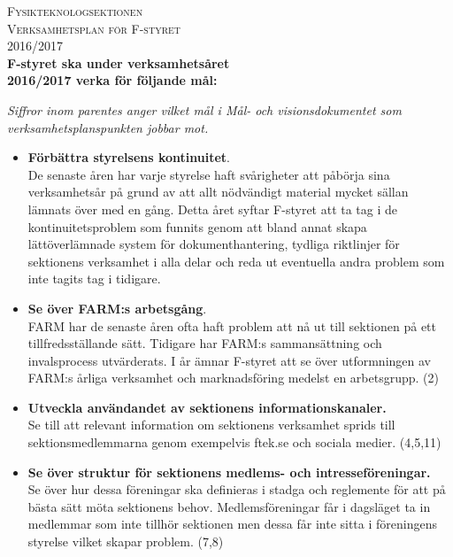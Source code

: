 \documentclass[a4paper]{article}
\begin{document}
\begin{center}
\textsc{\Huge Fysikteknologsektionen}\\[0.5cm]
\textsc{\large Verksamhetsplan för F-styret\\}
\textsc{\large 2016/2017}\\[0.5cm] %


\large \textbf{F-styret ska under verksamhetsåret\\2016/2017 verka för
följande mål:}\\
\normalsize
\end{center}
\textit{Siffror inom parentes anger vilket mål i Mål- och visionsdokumentet som verksamhetsplanspunkten jobbar mot.}\\
\normalsize

\begin{itemize}

\item \textbf{Förbättra styrelsens kontinuitet}.\\
De senaste åren har varje styrelse haft svårigheter att påbörja sina verksamhetsår på grund av att allt nödvändigt material mycket sällan lämnats över med en gång. Detta året syftar F-styret att ta tag i de kontinuitetsproblem som funnits genom att bland annat skapa lättöverlämnade system för dokumenthantering, tydliga riktlinjer för sektionens verksamhet i alla delar och reda ut eventuella andra problem som inte tagits tag i tidigare.

\item \textbf{Se över FARM:s arbetsgång}.\\
FARM har de senaste åren ofta haft problem att nå ut till sektionen på ett tillfredsställande sätt. Tidigare har FARM:s sammansättning och invalsprocess utvärderats. I år ämnar F-styret att se över utformningen av FARM:s årliga verksamhet och marknadsföring medelst en arbetsgrupp. (2) %

\item \textbf{Utveckla användandet av sektionens informationskanaler.}\\
Se till att relevant information om sektionens verksamhet sprids till sektionsmedlemmarna genom exempelvis ftek.se och sociala medier. (4,5,11)


\item \textbf{Se över struktur för sektionens medlems- och intresseföreningar.}\\
Se över hur dessa föreningar ska definieras i stadga och reglemente för att på bästa sätt möta sektionens behov. Medlemsföreningar får i dagsläget ta in medlemmar som inte tillhör sektionen men dessa får inte sitta i föreningens styrelse vilket skapar problem. (7,8) 


\end{itemize}
\end{document}
